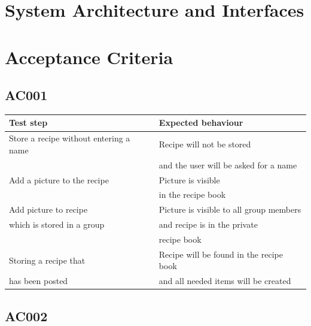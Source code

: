 \documentclass[12pt]{article}
\theoremstyle{definition}
\begin{document}
\pagebreak

\section{System Architecture and Interfaces}

\pagebreak

\section{Acceptance Criteria}

\subsection{AC001}

\begin{tabular}{|l|l|}
\hline
Test step & Expected behaviour \\ \hline
Store a recipe without entering a name & Recipe will not be stored \\ 
 & and the user will be asked for a name \\ \hline
Add a picture to the recipe & Picture is visible \\
 & in the recipe book \\ \hline
Add picture to recipe & Picture is visible to all group members\\
which is stored in a group & and recipe is in the private \\ 
& recipe book \\ \hline
Storing a recipe that & Recipe will be found in the recipe book\\
has been posted & and all needed items will be created\\ \hline
\end{tabular}


\subsection{AC002}
\end{document}
